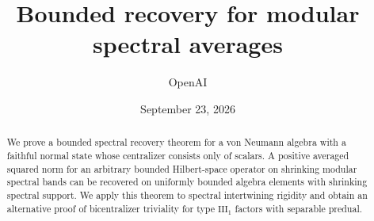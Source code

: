 \documentclass[11pt]{article}
\title{Bounded recovery for modular spectral averages}
\author{OpenAI}
\date{September 23, 2026}
\begin{document}
\maketitle
\begin{abstract}
We prove a bounded spectral recovery theorem for a von Neumann algebra with
a faithful normal state whose centralizer consists only of scalars. A positive
averaged squared norm for an arbitrary bounded Hilbert-space operator on
shrinking modular spectral bands can be recovered on uniformly bounded algebra
elements with shrinking spectral support. We apply this theorem to spectral
intertwining rigidity and obtain an alternative proof of bicentralizer triviality
for type $\mathrm{III}_1$ factors with separable predual.
\end{abstract}







\end{document}
